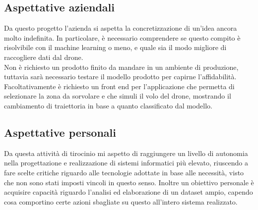 \subsection{Aspettative aziendali}
Da questo progetto l'azienda si aspetta la concretizzazione di un'idea ancora molto indefinita. In particolare, è necessario comprendere se questo compito
è risolvibile con il machine learning o meno, e quale sia il modo migliore di raccogliere dati dal drone.\\
Non è richiesto un prodotto finito da mandare in un ambiente di produzione, tuttavia sarà necessario testare il modello prodotto per capirne l'affidabilità.\\
Facoltativamente è richiesto un front end per l'applicazione che permetta di selezionare la zona da sorvolare e che simuli il volo del drone, mostrando il cambiamento
di traiettoria in base a quanto classificato dal modello.

\subsection{Aspettative personali}
Da questa attività di tirocinio mi aspetto di raggiungere un livello di autonomia nella progettazione e realizzazione di sistemi informatici più elevato,
riuscendo a fare scelte critiche riguardo alle tecnologie adottate in base alle necessità, visto che non sono stati imposti vincoli in questo senso.
Inoltre un obiettivo personale è acquisire capacità riguardo l'analisi ed elaborazione di un dataset ampio, capendo cosa comportino certe azioni sbagliate su questo
all'intero sistema realizzato.

